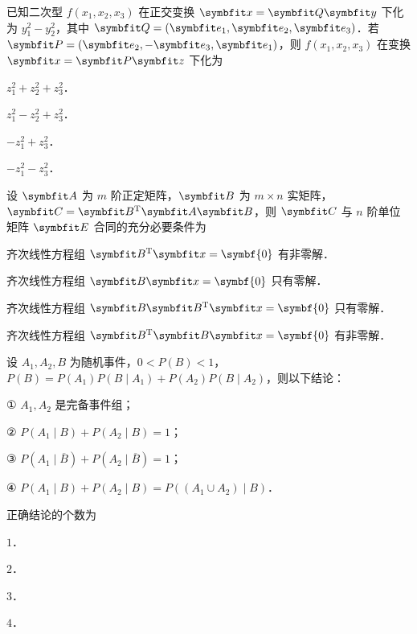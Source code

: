 \begin{question}[index=6]
已知二次型 $f(x_1,x_2,x_3)$ 在正交变换 $\symbfit x=\symbfit Q\symbfit y$ 下化为 $y_1^2-y_2^2$，其中 $\symbfit Q=(\symbfit e_1,\symbfit e_2,\symbfit e_3)$．若
$\symbfit P=(\symbfit e_2,-\symbfit e_3,\symbfit e_1)$，则 $f(x_1,x_2,x_3)$ 在变换 $\symbfit x=\symbfit P\symbfit z$ 下化为
\begin{choices}[columns=4]
\item $z_1^2+z_2^2+z_3^2$．
\item $z_1^2-z_2^2+z_3^2$．
\item $-z_1^2+z_3^2$．
\item $-z_1^2-z_3^2$．
\end{choices}
\end{question}
\QuestionBreak

\begin{question}[index=7]
设 $\symbfit A$ 为 $m$ 阶正定矩阵，$\symbfit B$ 为 $m\times n$ 实矩阵，$\symbfit C=\symbfit B^{\mathrm T}\symbfit A\symbfit B$，则 $\symbfit C$ 与 $n$ 阶单位矩阵 $\symbfit E$ 合同的充分必要条件为
\begin{choices}[columns=1]
\item 齐次线性方程组 $\symbfit B^{\mathrm T}\symbfit x=\symbf{0}$ 有非零解．
\item 齐次线性方程组 $\symbfit B\symbfit x=\symbf{0}$ 只有零解．
\item 齐次线性方程组 $\symbfit B\symbfit B^{\mathrm T}\symbfit x=\symbf{0}$ 只有零解．
\item 齐次线性方程组 $\symbfit B^{\mathrm T}\symbfit B\symbfit x=\symbf{0}$ 有非零解．
\end{choices}
\end{question}
\QuestionBreak

\begin{question}[index=8]
设 $A_1,A_2,B$ 为随机事件，$0<P(B)<1$，$P(B)=P(A_1)P(B\mid A_1)+P(A_2)P(B\mid A_2)$，则以下结论：\par
① $A_1,A_2$ 是完备事件组；\par
② $P(A_1\mid B)+P(A_2\mid B)=1$；\par
③ $P(A_1\mid\overline B)+P(A_2\mid\overline B)=1$；\par
④ $P(A_1\mid B)+P(A_2\mid B)=P((A_1\cup A_2)\mid B)$．\par
正确结论的个数为
\begin{choices}[columns=4]
\item $1$．
\item $2$．
\item $3$．
\item $4$．
\end{choices}
\end{question}
\QuestionBreak

